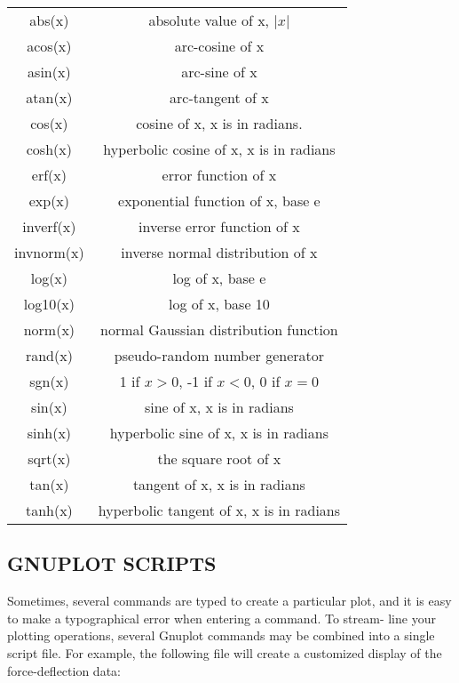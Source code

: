		\begin{center}
			\begin{tabular}{ c c }
			      abs(x)      &      absolute value of x, $|x|$\\
			      acos(x)     &    arc-cosine  of x\\
			      asin(x)     &      arc-sine    of x\\  
			      atan(x)     &      arc-tangent of x\\
			      cos(x)      &      cosine      of x,  x is in radians.\\
			      cosh(x)     &      hyperbolic cosine of x, x is in radians\\
			      erf(x)      &      error function of x\\
			      exp(x)      &      exponential function of x, base e\\
			      inverf(x)   &      inverse error function of x\\
			      invnorm(x)  &      inverse normal distribution of x\\
			      log(x)      &      log of x, base e\\
			      log10(x)    &      log of x, base 10\\
			      norm(x)     &      normal Gaussian distribution function\\
			      rand(x)     &      pseudo-random number generator      \\
			      sgn(x)      &      1 if $x > 0$, -1 if $x < 0$, 0 if $x=0$\\
			      sin(x)      &      sine      of x, x is in radians\\
			      sinh(x)     &      hyperbolic sine of x, x is in radians\\
			      sqrt(x)     &      the square root of x\\
			      tan(x)      &      tangent of x, x is in radians\\
			      tanh(x)     &      hyperbolic tangent of x, x is in radians  
			    \end{tabular}
			\end{center}
\subsection{GNUPLOT SCRIPTS }  
Sometimes, several commands are typed to create a particular plot, and it is easy to make a typographical error when entering a command. To stream- line your plotting operations, several Gnuplot commands may be combined into a single script file. For example, the following file will create a customized display of the force-deflection data:
	 
